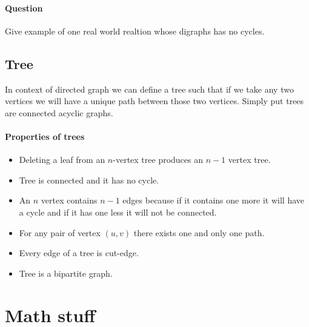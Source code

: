 \paragraph{Question}Give example of one real world realtion whose digraphs has no cycles.


\subsection{Tree}
In context of directed graph we can define a tree such that if we take any two vertices we will have a unique path between those two vertices. Simply put trees are connected acyclic graphs.


\paragraph{Properties of trees}\begin{itemize}
    \item Deleting a leaf from an $n$-vertex tree produces an $n-1$ vertex tree.
    \item Tree is connected and it has no cycle.
    \item An $n$ vertex contains $n-1$ edges because if it contains one more it will have a cycle and if it has one less it will not be connected. 
    \item For any pair of vertex $(u, v)$ there exists one and only one path.
    \item Every edge of a tree is cut-edge.
    \item Tree is a bipartite graph.
\end{itemize}


\section{Math stuff}


